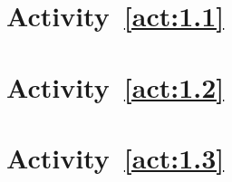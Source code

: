 \section{Activity~\ref{act:1.1}}



\section{Activity~\ref{act:1.2}}



\section{Activity~\ref{act:1.3}}



